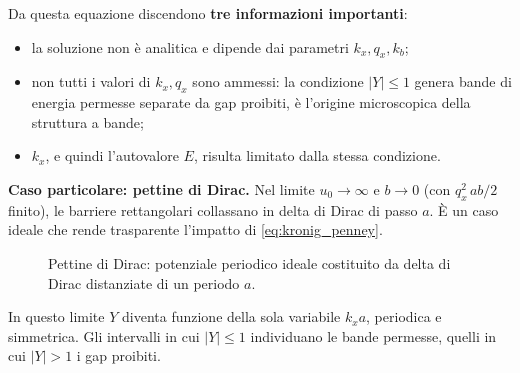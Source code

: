 \begin{example}
Da questa equazione discendono \textbf{tre informazioni importanti}:
\begin{itemize}
    \item la soluzione non è analitica e dipende dai parametri \( k_x, q_x, k_b \);
    \item non tutti i valori di \( k_x, q_x \) sono ammessi: la condizione \( |Y| \le 1 \) genera bande di energia permesse separate da gap proibiti, è l'origine microscopica della struttura a bande;
    \item \( k_x \), e quindi l'autovalore \( E \), risulta limitato dalla stessa condizione.
\end{itemize}

\textbf{Caso particolare: pettine di Dirac.} Nel limite \( u_0 \to \infty \) e \( b \to 0 \) (con \( q_x^2\, ab/2 \) finito), le barriere rettangolari collassano in delta di Dirac di passo \( a \). È un caso ideale che rende trasparente l'impatto di \eqref{eq:kronig_penney}.

\begin{figure}[htbp]
    \centering
    \caption{Pettine di Dirac: potenziale periodico ideale costituito da delta di Dirac distanziate di un periodo \( a \).}
    \label{fig:pettine_dirac}
\end{figure}

In questo limite \( Y \) diventa funzione della sola variabile \( k_x a \), periodica e simmetrica. Gli intervalli in cui \( |Y| \le 1 \) individuano le bande permesse, quelli in cui \( |Y| > 1 \) i gap proibiti.

\begin{figure}[htbp]
    \centering
\end{figure}
\end{example}
